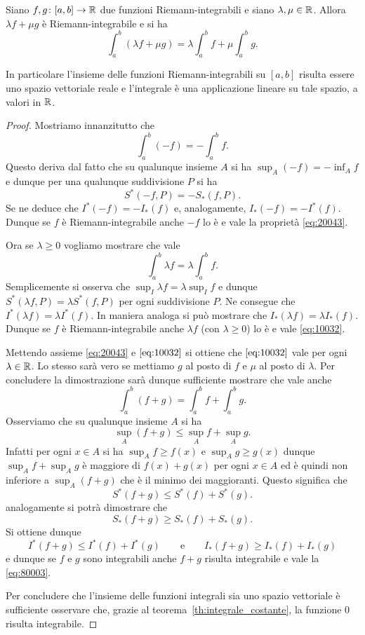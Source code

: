 \begin{theorem}
\mymark{*}
\label{th:integrale_lineare}
Siano $f,g\colon [a,b]\to {\mathbb R}$ due funzioni Riemann-integrabili
e siano $\lambda, \mu \in {\mathbb R}$. Allora $\lambda f + \mu g$
è Riemann-integrabile e si ha
\[
  \int_a^b (\lambda f + \mu g) = \lambda \int_a^b f + \mu \int_a^b g.
\]

In particolare l'insieme delle funzioni Riemann-integrabili su $[a,b]$ risulta
essere uno spazio vettoriale reale e l'integrale è una
applicazione lineare su tale spazio, a valori in ${\mathbb R}$.
\end{theorem}
%
\begin{proof}
\mymark{*}
Mostriamo innanzitutto che
\begin{equation}\label{eq:20043}
  \int_a^b (-f) = -\int_a^b f.
\end{equation}
Questo deriva dal fatto che su qualunque insieme $A$ si ha
$\sup_A (-f) = -\inf_A f$ e dunque per una qualunque suddivisione $P$
si ha
\[
  S^*(-f,P) = -S_*(f,P).
\]
Se ne deduce che $I^*(-f) = -I_*(f)$ e, analogamente, $I_*(-f) = -I^*(f)$.
Dunque se $f$ è Riemann-integrabile anche $-f$ lo è e vale la proprietà \eqref{eq:20043}.

Ora se $\lambda \ge 0$ vogliamo mostrare che vale
\begin{equation}\label{eq:10032}
  \int_a^b \lambda f = \lambda \int_a^b f.
\end{equation}
Semplicemente si osserva che $\sup_I \lambda f = \lambda \sup_I f$ e dunque
$S^*(\lambda f,P) = \lambda S^*(f,P)$ per ogni suddivisione $P$.
Ne consegue che $I^*(\lambda f) = \lambda I^*(f)$. In maniera analoga si può
mostrare che $I_*(\lambda f) = \lambda I_*(f)$. Dunque se $f$ è
Riemann-integrabile anche $\lambda f$ (con $\lambda \ge 0$) lo è e vale \eqref{eq:10032}.

Mettendo assieme \eqref{eq:20043} e $\eqref{eq:10032}$ si ottiene
che $\eqref{eq:10032}$ vale per ogni $\lambda \in {\mathbb R}$.
Lo stesso sarà vero se mettiamo $g$ al posto di $f$ e $\mu$ al posto di $\lambda$.
Per concludere la dimostrazione sarà dunque sufficiente
mostrare che vale anche
\begin{equation}\label{eq:80003}
\int_a^b (f+g) = \int_a^b f + \int_a^b g.
\end{equation}
Osserviamo che su qualunque insieme $A$ si ha
\[
  \sup_A (f+g) \le \sup_A f + \sup_A g.
\]
Infatti per ogni $x\in A$ si ha $\sup_A f\ge f(x)$ 
e $\sup_A g \ge g(x)$ dunque $\sup_A f + \sup_A g$
è maggiore di $f(x)+g(x)$ per ogni $x\in A$ 
ed è quindi non inferiore a $\sup_A (f+g)$ che 
è il minimo dei maggioranti.
Questo significa che
\[
  S^*(f+g) \le S^*(f) + S^*(g).
\]
analogamente si potrà dimostrare che
\[
  S_*(f+g) \ge S_*(f) + S_*(g).
\]
Si ottiene dunque
\[
  I^*(f+g) \le I^*(f) + I^*(g)
  \qquad\text{e}\qquad
  I_*(f+g) \ge I_*(f) + I_*(g)
\]
e dunque se $f$ e $g$ sono integrabili anche $f+g$ risulta integrabile
e vale la \eqref{eq:80003}.

Per concludere che l'insieme delle funzioni integrali sia uno spazio vettoriale
è sufficiente osservare che, grazie al teorema~\ref{th:integrale_costante},
la funzione $0$ risulta integrabile.
\end{proof}

